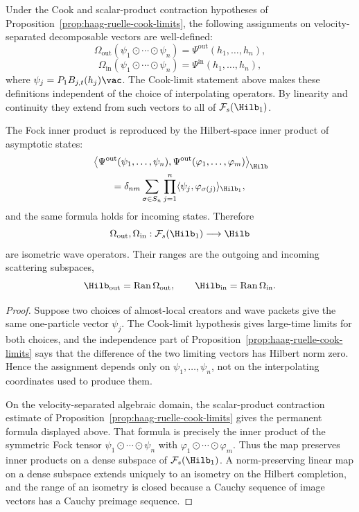 \begin{proposition}
\label{prop:hr-scalar-wave-operator-isometry}
Under the Cook and scalar-product contraction hypotheses of
Proposition~\ref{prop:haag-ruelle-cook-limits}, the following assignments on
velocity-separated decomposable vectors are well-defined:
\[
  \Omega_{\mathrm{out}}
  (\psi_1\odot\cdots\odot\psi_n)
  =
  \Psi^{\mathrm{out}}(h_1,\ldots,h_n),
\]
\[
\Omega_{\mathrm{in}}
  (\psi_1\odot\cdots\odot\psi_n)
  =
  \Psi^{\mathrm{in}}(h_1,\ldots,h_n),
\]
where \(\psi_j=P_1B_{j,t}(h_j)\vac\).  The Cook-limit statement above makes these
definitions independent of the choice of interpolating operators. By
linearity and continuity they extend from such vectors to all of
\(\mathcal F_s(\Hilb_1)\).

The Fock inner product is reproduced by the Hilbert-space inner product of
asymptotic states:
\[
\begin{aligned}
&\left\langle
  \Psi^{\mathrm{out}}(\psi_1,\ldots,\psi_n),
  \Psi^{\mathrm{out}}(\varphi_1,\ldots,\varphi_m)
  \right\rangle_{\Hilb}
\\
&\qquad =
  \delta_{nm}
  \sum_{\sigma\in S_n}
  \prod_{j=1}^n
  \langle\psi_j,\varphi_{\sigma(j)}\rangle_{\Hilb_1},
\end{aligned}
\]
and the same formula holds for incoming states. Therefore
\[
  \Omega_{\mathrm{out}},
  \Omega_{\mathrm{in}}
  :
  \mathcal F_s(\Hilb_1)\longrightarrow \Hilb
\]
are isometric wave operators. Their ranges are the outgoing and incoming
scattering subspaces,
\[
  \Hilb_{\mathrm{out}}=\operatorname{Ran}\Omega_{\mathrm{out}},
  \qquad
  \Hilb_{\mathrm{in}}=\operatorname{Ran}\Omega_{\mathrm{in}} .
\]
\end{proposition}

\begin{proof}
Suppose two choices of almost-local creators and wave packets give the same
one-particle vector \(\psi_j\).  The Cook-limit hypothesis gives large-time
limits for both choices, and the independence part of
Proposition~\ref{prop:haag-ruelle-cook-limits} says that the difference of
the two limiting vectors has Hilbert norm zero.  Hence the assignment depends
only on \(\psi_1,\ldots,\psi_n\), not on the interpolating coordinates used to
produce them.

On the velocity-separated algebraic domain, the scalar-product contraction
estimate of Proposition~\ref{prop:haag-ruelle-cook-limits} gives the
permanent formula displayed above.  That formula is precisely the inner
product of the symmetric Fock tensor
\(\psi_1\odot\cdots\odot\psi_n\) with
\(\varphi_1\odot\cdots\odot\varphi_m\).  Thus the map preserves inner
products on a dense subspace of \(\mathcal F_s(\Hilb_1)\).  A norm-preserving
linear map on a dense subspace extends uniquely to an isometry on the Hilbert
completion, and the range of an isometry is closed because a Cauchy sequence
of image vectors has a Cauchy preimage sequence.
\end{proof}


